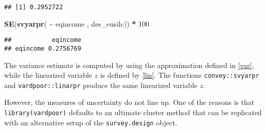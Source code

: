 \documentclass[
]{book}
\newenvironment{Shaded}{\begin{snugshade}}{\end{snugshade}}
\newcommand{\CommentTok}[1]{\textcolor[rgb]{0.56,0.35,0.01}{\textit{#1}}}
\newcommand{\DecValTok}[1]{\textcolor[rgb]{0.00,0.00,0.81}{#1}}
\newcommand{\FunctionTok}[1]{\textcolor[rgb]{0.13,0.29,0.53}{\textbf{#1}}}
\newcommand{\NormalTok}[1]{#1}
\newcommand{\SpecialCharTok}[1]{\textcolor[rgb]{0.81,0.36,0.00}{\textbf{#1}}}
\begin{document}
\begin{Shaded}
\end{Shaded}

\begin{verbatim}
## [1] 0.2952722
\end{verbatim}

\begin{Shaded}
\begin{Highlighting}[]
\FunctionTok{SE}\NormalTok{(}\FunctionTok{svyarpr}\NormalTok{( }\SpecialCharTok{\textasciitilde{}}\NormalTok{ eqincome , des\_eusilc)) }\SpecialCharTok{*} \DecValTok{100}
\end{Highlighting}
\end{Shaded}

\begin{verbatim}
##           eqincome
## eqincome 0.2756769
\end{verbatim}

The variance estimate is computed by using the approximation defined in \ref{var}, while the linearized variable \(z\) is defined by \ref{lin}. The functions \texttt{convey::svyarpr} and \texttt{vardpoor::linarpr} produce the same linearized variable \(z\).

However, the measures of uncertainty do not line up. One of the reasons is that \texttt{library(vardpoor)} defaults to an ultimate cluster method that can be replicated with an alternative setup of the \texttt{survey.design} object.
\end{document}
